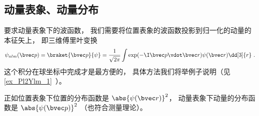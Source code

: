 \subsection{动量表象、动量分布}
要求动量表象下的波函数， 我们需要将位置表象的波函数投影到归一化的动量的本征矢上， 即三维傅里叶变换
\begin{equation}
\psi_{nlm}(\bvec p) = \braket{\bvec p}{\psi} = \frac{1}{\sqrt{2\pi}} \int \exp(-\I \bvec p \vdot \bvec r) \psi(\bvec r) \dd[3]{r}~.
\end{equation}
这个积分在球坐标中完成才是最方便的， 具体方法我们将举例子说明（见\autoref{ex_Pl2Ylm_1}~）。

正如位置表象下位置的分布函数是 $\abs{\psi(\bvec r)}^2$， 动量表象下动量的分布函数是 $\abs{\psi(\bvec p)}^2$ （也符合测量理论）。
